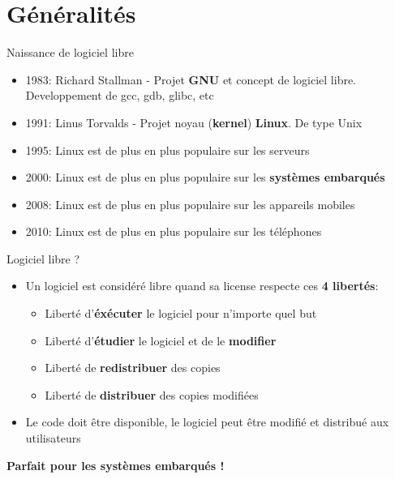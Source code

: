 \section{Généralités}

 \begin{frame}{Naissance de logiciel libre}{}
  \begin{itemize}
  \item 1983: Richard Stallman - Projet \textbf{GNU} et concept de logiciel libre. Developpement de gcc, gdb, glibc, etc
  \item 1991: Linus Torvalds - Projet noyau (\textbf{kernel}) \textbf{Linux}. De type Unix
  \item 1995: Linux est de plus en plus populaire sur les serveurs
  \item 2000: Linux est de plus en plus populaire sur les \textbf{systèmes embarqués}
  \item 2008: Linux est de plus en plus populaire sur les appareils mobiles
  \item 2010: Linux est de plus en plus populaire sur les téléphones
  \end{itemize}
\end{frame}

\begin{frame}{Logiciel libre ?}{}
  \begin{itemize}
  \item Un logiciel est considéré libre quand sa license respecte ces \textbf{4 libertés}:
    \begin{itemize}
    \item Liberté d'\textbf{éxécuter} le logiciel pour n'importe quel but
    \item Liberté d'\textbf{étudier} le logiciel et de le \textbf{modifier}
    \item Liberté de \textbf{redistribuer} des copies
    \item Liberté de \textbf{distribuer} des copies modifiées
    \end{itemize}
  \item Le code doit être disponible, le logiciel peut être modifié et distribué aux utilisateurs
  \end{itemize}
  \center\textbf{Parfait pour les systèmes embarqués !}
\end{frame}


